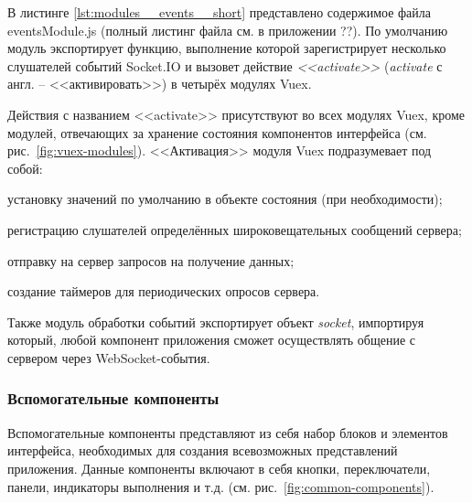 В листинге \ref{lst:modules__events__short} представлено содержимое файла eventsModule.js (полный листинг файла см. в приложении ??). По умолчанию модуль экспортирует функцию, выполнение которой зарегистрирует несколько слушателей событий Socket.IO и вызовет действие \emph{<<activate>>} (\emph{activate} с англ. -- <<активировать>>) в четырёх модулях Vuex.

Действия с названием <<activate>> присутствуют во всех модулях Vuex, кроме модулей, отвечающих за хранение состояния компонентов интерфейса (см. рис.~\ref{fig:vuex-modules}). <<Активация>> модуля Vuex подразумевает под собой:
\begin{dashitemize}
  \item установку значений по умолчанию в объекте состояния (при необходимости);
  \item регистрацию слушателей определённых широковещательных сообщений сервера;
  \item отправку на сервер запросов на получение данных;
  \item создание таймеров для периодических опросов сервера.
\end{dashitemize}



Также модуль обработки событий экспортирует объект \emph{socket}, импортируя который, любой компонент приложения сможет осуществлять общение с сервером через WebSocket-события.


\subsubsection{Вспомогательные компоненты}

Вспомогательные компоненты представляют из себя набор блоков и элементов интерфейса, необходимых для создания всевозможных представлений приложения. Данные компоненты включают в себя кнопки, переключатели, панели, индикаторы выполнения и т.д. (см. рис.~\ref{fig:common-components}).

